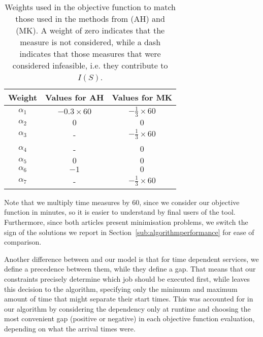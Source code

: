 \documentclass[a4paper,11pt,authoryear]{elsarticle}
\begin{document}
\begin{table}[htbp!]
    \centering
    \caption{Weights used in the objective function to match those used in the methods from  \citet{aithaddadene2016} (AH) and \citet{mankowska2014} (MK). A weight of zero indicates that the measure is not considered, while a dash indicates that those measures that were considered infeasible, i.e. they contribute to $I(S)$.}
    \begin{tabular}{ccc}
    \toprule
    \textbf{Weight}  & \textbf{Values for AH} & \textbf{Values for MK} \\
    \midrule
    $\alpha_1$      &   $-0.3\times60$          &  $-\frac{1}{3}\times60$   \\
    $\alpha_2$      &   $0$                     &  $0$                      \\
    $\alpha_3$      &   -                       &  $-\frac{1}{3}\times60$   \\
    $\alpha_4$      &   -                       &  $0$   \\   
    $\alpha_5$      &   $0$                     &  $0$                      \\       
    $\alpha_6$      &   $-1$                    &  $0$                      \\    
    $\alpha_7$      &   -                       &  $-\frac{1}{3}\times60$             \\    
    \bottomrule
    \end{tabular}
    \label{table:adaptedobjvalues}
\end{table}

\noindent Note that we multiply time measures by $60$, since we consider our objective function in minutes, so it is easier to understand by final users of the tool. Furthermore, since both articles present minimisation problems, we switch the sign of the solutions we report in Section~\ref{sub:algorithmperformance} for ease of comparison.

Another difference between \cite{aithaddadene2016} and our model is that for time dependent services, we define a precedence between them, while they define a gap. That means that our constraints precisely determine which job should be executed first, while \cite{aithaddadene2016} leaves this decision to the algorithm, specifying only the minimum and maximum amount of time that might separate their start times. This was accounted for in our algorithm by considering the dependency only at runtime and choosing the most convenient gap (positive or negative) in each objective function evaluation, depending on what the arrival times were.
\end{document}
